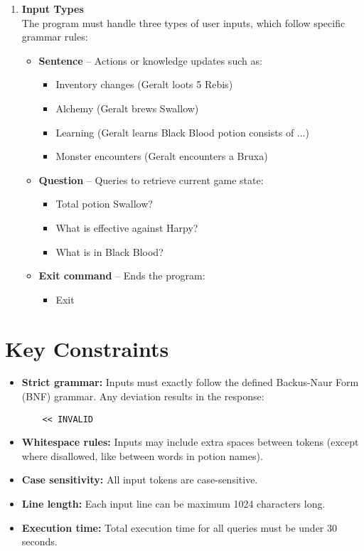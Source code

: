 \documentclass{article}
\begin{document}
\begin{enumerate}
    \item \textbf{Input Types} \\
    The program must handle three types of user inputs, which follow specific grammar rules:
    \begin{itemize}
        \item \textbf{Sentence} – Actions or knowledge updates such as:
        \begin{itemize}
            \item Inventory changes (Geralt loots 5 Rebis)
            \item Alchemy (Geralt brews Swallow)
            \item Learning (Geralt learns Black Blood potion consists of ...)
            \item Monster encounters (Geralt encounters a Bruxa)
        \end{itemize}
        \item \textbf{Question} – Queries to retrieve current game state:
        \begin{itemize}
            \item Total potion Swallow?
            \item What is effective against Harpy?
            \item What is in Black Blood?
        \end{itemize}
        \item \textbf{Exit command} – Ends the program:
        \begin{itemize}
            \item Exit
        \end{itemize}
    \end{itemize}
\end{enumerate}

\section*{Key Constraints}

\begin{itemize}
    \item \textbf{Strict grammar:} Inputs must exactly follow the defined Backus-Naur Form (BNF) grammar. Any deviation results in the response:
    \begin{verbatim}
    << INVALID
    \end{verbatim}
    \item \textbf{Whitespace rules:} Inputs may include extra spaces between tokens (except where disallowed, like between words in potion names).
    \item \textbf{Case sensitivity:} All input tokens are case-sensitive.
    \item \textbf{Line length:} Each input line can be maximum 1024 characters long.
    \item \textbf{Execution time:} Total execution time for all queries must be under 30 seconds.
\end{itemize}
\end{document}
